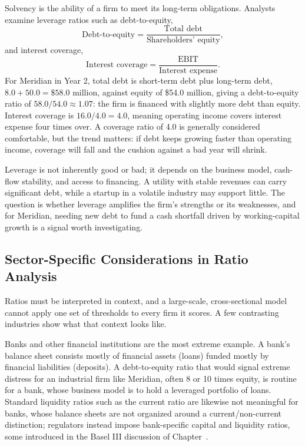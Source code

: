 \documentclass[../ai_in_finance]{subfiles}
\begin{document}
Solvency is the ability of a firm to meet its long-term obligations. Analysts examine leverage ratios such as debt-to-equity,
\begin{equation*}
\text{Debt-to-equity} = \frac{\text{Total debt}}{\text{Shareholders' equity}},
\end{equation*}
and interest coverage,
\begin{equation*}
\text{Interest coverage} = \frac{\text{EBIT}}{\text{Interest expense}}.
\end{equation*}
For Meridian in Year 2, total debt is short-term debt plus long-term debt, $8.0 + 50.0 = \$58.0$ million, against equity of \$54.0 million, giving a debt-to-equity ratio of $58.0/54.0 \approx 1.07$: the firm is financed with slightly more debt than equity. Interest coverage is $16.0/4.0 = 4.0$, meaning operating income covers interest expense four times over. A coverage ratio of 4.0 is generally considered comfortable, but the trend matters: if debt keeps growing faster than operating income, coverage will fall and the cushion against a bad year will shrink.

Leverage is not inherently good or bad; it depends on the business model, cash-flow stability, and access to financing. A utility with stable revenues can carry significant debt, while a startup in a volatile industry may support little. The question is whether leverage amplifies the firm's strengths or its weaknesses, and for Meridian, needing new debt to fund a cash shortfall driven by working-capital growth is a signal worth investigating.

\subsection{Sector-Specific Considerations in Ratio Analysis}

Ratios must be interpreted in context, and a large-scale, cross-sectional model cannot apply one set of thresholds to every firm it scores. A few contrasting industries show what that context looks like.

Banks and other financial institutions are the most extreme example. A bank's balance sheet consists mostly of financial assets (loans) funded mostly by financial liabilities (deposits). A debt-to-equity ratio that would signal extreme distress for an industrial firm like Meridian, often 8 or 10 times equity, is routine for a bank, whose business model is to hold a leveraged portfolio of loans. Standard liquidity ratios such as the current ratio are likewise not meaningful for banks, whose balance sheets are not organized around a current/non-current distinction; regulators instead impose bank-specific capital and liquidity ratios, some introduced in the Basel III discussion of Chapter~.
\end{document}
